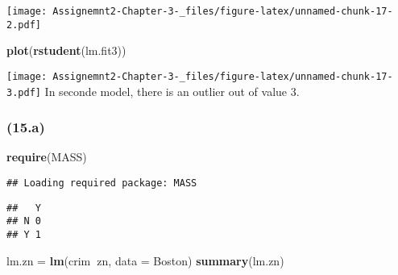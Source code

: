 \documentclass[]{article}
\newenvironment{Shaded}{\begin{snugshade}}{\end{snugshade}}
\newcommand{\DataTypeTok}[1]{\textcolor[rgb]{0.13,0.29,0.53}{#1}}
\newcommand{\KeywordTok}[1]{\textcolor[rgb]{0.13,0.29,0.53}{\textbf{#1}}}
\newcommand{\NormalTok}[1]{#1}
\newcommand{\OperatorTok}[1]{\textcolor[rgb]{0.81,0.36,0.00}{\textbf{#1}}}
\newcommand{\StringTok}[1]{\textcolor[rgb]{0.31,0.60,0.02}{#1}}
\begin{document}
\texttt{[image: Assignemnt2-Chapter-3-\_files/figure-latex/unnamed-chunk-17-2.pdf]}

\begin{Shaded}
\begin{Highlighting}[]
\KeywordTok{plot}\NormalTok{(}\KeywordTok{rstudent}\NormalTok{(lm.fit3))}
\end{Highlighting}
\end{Shaded}

\texttt{[image: Assignemnt2-Chapter-3-\_files/figure-latex/unnamed-chunk-17-3.pdf]}
In seconde model, there is an outlier out of value 3.

\hypertarget{a-3}{%
\subsubsection{(15.a)}\label{a-3}}

\begin{Shaded}
\begin{Highlighting}[]
\KeywordTok{require}\NormalTok{(MASS)}
\end{Highlighting}
\end{Shaded}

\begin{verbatim}
## Loading required package: MASS
\end{verbatim}

\begin{Shaded}
\end{Shaded}

\begin{verbatim}
##   Y
## N 0
## Y 1
\end{verbatim}

\begin{Shaded}
\begin{Highlighting}[]
\NormalTok{lm.zn =}\StringTok{ }\KeywordTok{lm}\NormalTok{(crim}\OperatorTok{~}\NormalTok{zn, }\DataTypeTok{data =}\NormalTok{ Boston)}
\KeywordTok{summary}\NormalTok{(lm.zn)}
\end{Highlighting}
\end{Shaded}
\end{document}

